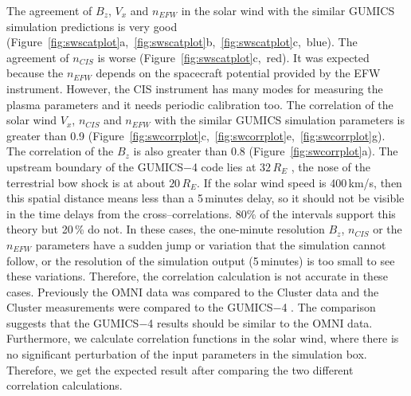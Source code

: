 \documentclass[linenumbers,draft]{agujournal}
\begin{document}
The agreement of $B_{z}$, $V_{x}$ and $n_{EFW}$ in the solar wind with the similar GUMICS simulation predictions is very good (Figure~\ref{fig:swscatplot}a,~\ref{fig:swscatplot}b,~\ref{fig:swscatplot}c,~blue). The agreement of $n_{CIS}$ is worse (Figure~\ref{fig:swscatplot}c,~red). It was expected because the $n_{EFW}$ depends on the spacecraft potential provided by the EFW instrument. However, the CIS instrument has many modes for measuring the plasma parameters and it needs periodic calibration too. The correlation of the solar wind $V_{x}$, $n_{CIS}$ and $n_{EFW}$ with the similar GUMICS simulation parameters is greater than 0.9 (Figure~\ref{fig:swcorrplot}c,~\ref{fig:swcorrplot}e,~\ref{fig:swcorrplot}g). The correlation of the $B_{z}$ is also greater than 0.8 (Figure~\ref{fig:swcorrplot}a). The upstream boundary of the GUMICS$-$4 code lies at $32\,R_E$ \citep{janhunen12:_gumic_mhd}, the nose of the terrestrial bow shock is at about $20\,R_E$. If the solar wind speed is 400\,km/s, then this spatial distance means less than a 5\,minutes delay, so it should not be visible in the time delays from the cross--correlations. 80\% of the intervals support this theory but 20\,\% do not. In these cases, the one-minute resolution $B_z$, $n_{CIS}$ or the $n_{EFW}$ parameters have a sudden jump or variation that the simulation cannot follow, or the resolution of the simulation output (5\,minutes) is too small to see these variations. Therefore, the correlation calculation is not accurate in these cases. Previously the OMNI data was compared to the Cluster data and the Cluster measurements were compared to the GUMICS$-$4 \citep{facsko16:_one_earth}. The comparison suggests that the GUMICS$-$4 results should be similar to the OMNI data. Furthermore, we calculate correlation functions in the solar wind, where there is no significant perturbation of the input parameters in the simulation box. Therefore, we get the expected result after comparing the two different correlation calculations.
\end{document}
